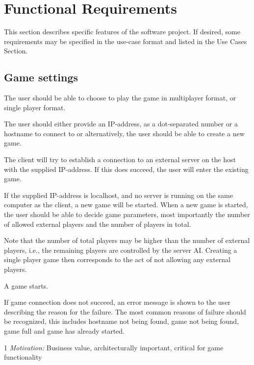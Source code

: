 \section{Functional Requirements}
This section describes specific features of the software project.  If desired, some requirements may be specified in the use-case format and listed in the Use Cases Section.

\subsection{Game settings}

The user should be able to choose to play the game in multiplayer format, or single player format.

The user should either provide an IP-address, as a dot-separated number or a hostname to connect to or alternatively, the user should be able to create a new game.

The client will try to establish a connection to an external server on the host with the supplied IP-address. 
If this does succeed, the user will enter the existing game.

If the supplied IP-address is localhost, and no server is running on the same computer as the client, a new game will be started. When a new game is started, the user should be able to decide game parameters, most importantly the number of allowed external players and the number of players in total.

Note that the number of total players may be higher than the number of external players, i.e., the remaining players are controlled by the server AI. Creating a single player game then corresponds to the act of not allowing any external players.

A game starts.

If game connection does not succeed, an error message is shown to the user describing the reason for the failure. The most common reasons of failure should be recognized, this includes hostname not being found, game not being found, game full and game has already started. 

1 \emph{Motivation:} Business value, architecturally important, critical for game functionality

\stoprequirement



